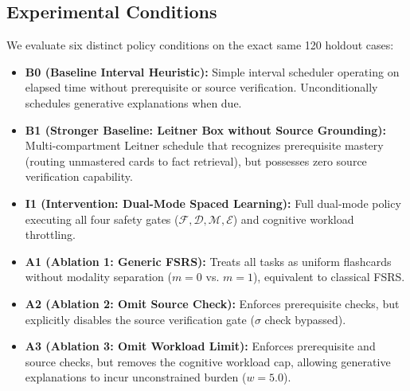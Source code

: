 \documentclass[11pt,a4paper]{article}
\begin{document}
\subsection{Experimental Conditions}
We evaluate six distinct policy conditions on the exact same 120 holdout cases:
\begin{itemize}[leftmargin=*]
    \item \textbf{B0 (Baseline Interval Heuristic):} Simple interval scheduler operating on elapsed time without prerequisite or source verification. Unconditionally schedules generative explanations when due.
    \item \textbf{B1 (Stronger Baseline: Leitner Box without Source Grounding):} Multi-compartment Leitner schedule that recognizes prerequisite mastery (routing unmastered cards to fact retrieval), but possesses zero source verification capability.
    \item \textbf{I1 (Intervention: Dual-Mode Spaced Learning):} Full dual-mode policy executing all four safety gates ($\mathcal{F}, \mathcal{D}, \mathcal{M}, \mathcal{E}$) and cognitive workload throttling.
    \item \textbf{A1 (Ablation 1: Generic FSRS):} Treats all tasks as uniform flashcards without modality separation ($m=0$ vs. $m=1$), equivalent to classical FSRS.
    \item \textbf{A2 (Ablation 2: Omit Source Check):} Enforces prerequisite checks, but explicitly disables the source verification gate ($\sigma$ check bypassed).
    \item \textbf{A3 (Ablation 3: Omit Workload Limit):} Enforces prerequisite and source checks, but removes the cognitive workload cap, allowing generative explanations to incur unconstrained burden ($w=5.0$).
\end{itemize}
\end{document}
